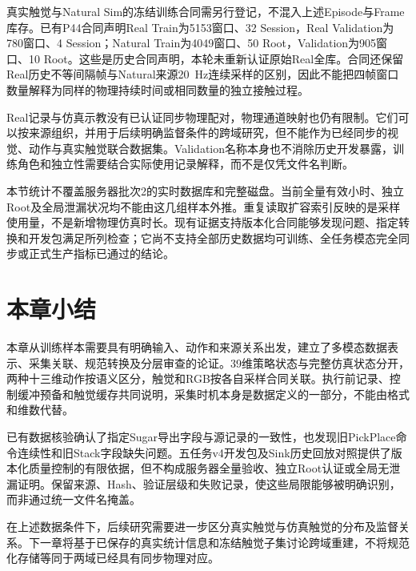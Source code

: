 真实触觉与Natural Sim的冻结训练合同需另行登记，不混入上述Episode与Frame库存。已有P44合同声明Real Train为5153窗口、32 Session，Real Validation为780窗口、4 Session；Natural Train为4049窗口、50 Root，Validation为905窗口、10 Root。这些是历史合同声明，本轮未重新认证原始Real全库。合同还保留Real历史不等间隔帧与Natural来源20~Hz连续采样的区别，因此不能把四帧窗口数量解释为同样的物理持续时间或相同数量的独立接触过程。

Real记录与仿真示教没有已认证同步物理配对，物理通道映射也仍有限制。它们可以按来源组织，并用于后续明确监督条件的跨域研究，但不能作为已经同步的视觉、动作与真实触觉联合数据集。Validation名称本身也不消除历史开发暴露，训练角色和独立性需要结合实际使用记录解释，而不是仅凭文件名判断。

本节统计不覆盖服务器批次2的实时数据库和完整磁盘。当前全量有效小时、独立Root及全局泄漏状况均不能由这几组样本外推。重复读取扩容索引反映的是采样使用量，不是新增物理仿真时长。现有证据支持版本化合同能够发现问题、指定转换和开发包满足所列检查；它尚不支持全部历史数据均可训练、全任务模态完全同步或正式生产指标已通过的结论。

\section{本章小结}
\label{sec:data_quality_summary}

本章从训练样本需要具有明确输入、动作和来源关系出发，建立了多模态数据表示、采集关联、规范转换及分层审查的论证。39维策略状态与完整仿真状态分开，两种十三维动作按语义区分，触觉和RGB按各自采样合同关联。执行前记录、控制缓冲预备和触觉缓存共同说明，采集时机本身是数据定义的一部分，不能由格式和维数代替。

已有数据核验确认了指定Sugar导出字段与源记录的一致性，也发现旧PickPlace命令连续性和旧Stack字段缺失问题。五任务v4开发包及Sink历史回放对照提供了版本化质量控制的有限依据，但不构成服务器全量验收、独立Root认证或全局无泄漏证明。保留来源、Hash、验证层级和失败记录，使这些局限能够被明确识别，而非通过统一文件名掩盖。

在上述数据条件下，后续研究需要进一步区分真实触觉与仿真触觉的分布及监督关系。下一章将基于已保存的真实统计信息和冻结触觉子集讨论跨域重建，不将规范化存储等同于两域已经具有同步物理对应。
